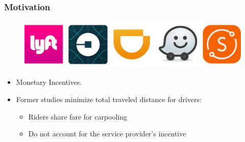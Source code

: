 \documentclass[t]{beamer}
\begin{document}
\begin{frame}\frametitle{Motivation}
\vspace{-0.28in}
\begin{figure}
	\centering
    \includegraphics[width = 0.55\columnwidth]{ride-sharings}
\end{figure}
\vspace{-0.23in}
\begin{itemize}
\item Monetary Incentives.
\item<2-> Former studies minimize total traveled distance for drivers:
\begin{itemize}
\item<2-> Riders share fare for carpooling
\item<5-> Do not account for the service provider's incentive
\end{itemize}
\vspace{-0.1in}
\end{itemize}
\end{frame}
\end{document}
